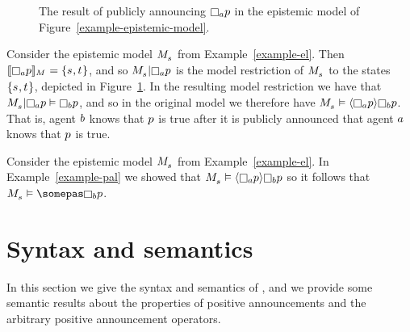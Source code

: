 \begin{example}\label{example-pal}
\begin{figure}
    \caption{The result of publicly announcing $\knowsA \atomP$ in the epistemic model of Figure~\ref{example-epistemic-model}.}\label{example-public-announcement}
    \centering
\end{figure}
Consider the epistemic model $\kPModel{\kStateS}$ from Example~\ref{example-el}.
Then $\interpretation[\kModel]{\knowsA \atomP} = \{\kStateS, \kStateT\}$, and so $\restrict{\kPModel{\kStateS}}{\knowsA \atomP}$ is the model restriction of $\kPModel{\kStateS}$ to the states $\{\kStateS, \kStateT\}$, depicted in Figure~\ref{example-public-announcement}.  
In the resulting model restriction we have that $\restrict{\kPModel{\kStateS}}{\knowsA \atomP} \entails \knowsB \atomP$, and so in the original model we therefore have $\kPModel{\kStateS} \entails \announceE{\knowsA \atomP} \knowsB \atomP$.
That is, agent $b$ knows that $p$ is true after it is publicly announced that agent $a$ knows that $p$ is true.
\end{example}

\begin{example}\label{example-apal}
Consider the epistemic model $\kPModel{\kStateS}$ from Example~\ref{example-el}.
In Example~\ref{example-pal} we showed that $\kPModel{\kStateS} \entails \announceE{\knowsA \atomP} \knowsB \atomP$ so it follows that $\kPModel{\kStateS} \entails \somepas \knowsB \atomP$.
\end{example}


\section{Syntax and semantics}\label{syntax-semantics}

In this section we give the syntax and semantics of \logicPapalS{}, and we provide some semantic results about the properties of positive announcements and the arbitrary positive announcement operators.


